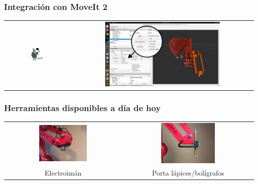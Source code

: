 \documentclass{beamer}
\begin{document}
\begin{frame}
\frametitle{Integración con MoveIt 2}
\begin{table}[htbp]
  \centering
  \begin{tabular}{cc}
      \includegraphics[width=0.2\textwidth, valign=m]{figs/setup_assistant.jpg} & \includegraphics[width=0.65\textwidth, valign=m]{figs/moveit_demo_trajectory.png} 
  \end{tabular}
\end{table}  
\end{frame}

\begin{frame}
\frametitle{Herramientas disponibles a día de hoy}
\begin{table}[htbp]
  \centering
  \begin{tabular}{cc}
      \includegraphics[width=0.43\textwidth, valign=m]{figs/electromagnet_tool.jpeg} & \includegraphics[width=0.43\textwidth, valign=m]{figs/pen_tool.jpg}  \\
      Electroimán & Porta lápices/bolígrafos
  \end{tabular}
\end{table}  
\end{frame}
\end{document}
